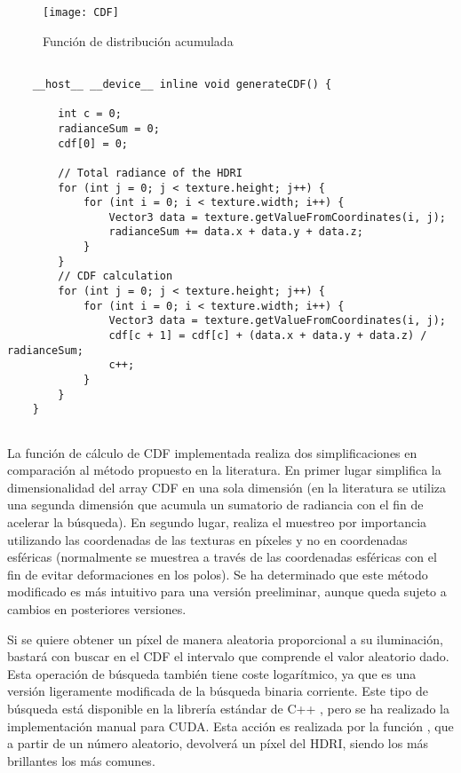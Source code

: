 \begin{figure}[H]
    \centering
	\texttt{[image: CDF]}
	\caption{Función de distribución acumulada}
	\label{fig:CDF}
\end{figure}


\begin{lstlisting}
	
	__host__ __device__ inline void generateCDF() {

		int c = 0;
		radianceSum = 0;
		cdf[0] = 0;

		// Total radiance of the HDRI
		for (int j = 0; j < texture.height; j++) {
			for (int i = 0; i < texture.width; i++) {
				Vector3 data = texture.getValueFromCoordinates(i, j);
				radianceSum += data.x + data.y + data.z;
			}
		}
		// CDF calculation
		for (int j = 0; j < texture.height; j++) {
			for (int i = 0; i < texture.width; i++) {
				Vector3 data = texture.getValueFromCoordinates(i, j);
				cdf[c + 1] = cdf[c] + (data.x + data.y + data.z) / radianceSum;
				c++;
			}
		}
	}
	
\end{lstlisting}

La función de cálculo de CDF implementada realiza dos simplificaciones en comparación al método propuesto en la literatura. En primer lugar simplifica la dimensionalidad del array CDF en una sola dimensión (en la literatura se utiliza una segunda dimensión que acumula un sumatorio de radiancia con el fin de acelerar la búsqueda). En segundo lugar, realiza el muestreo por importancia utilizando las coordenadas de las texturas en píxeles y no en coordenadas esféricas (normalmente se muestrea a través de las coordenadas esféricas con el fin de evitar deformaciones en los polos). Se ha determinado que este método modificado es más intuitivo para una versión preeliminar, aunque queda sujeto a cambios en posteriores versiones. 

Si se quiere obtener un píxel de manera aleatoria proporcional a su iluminación, bastará con buscar en el CDF el intervalo que comprende el valor aleatorio dado. Esta operación de búsqueda también tiene coste logarítmico, ya que es una versión ligeramente modificada de la búsqueda binaria corriente. Este tipo de búsqueda está disponible en la librería estándar de C++ , pero se ha realizado la implementación manual para CUDA. Esta acción es realizada por la función , que a partir de un número aleatorio, devolverá un píxel del HDRI, siendo los más brillantes los más comunes.

